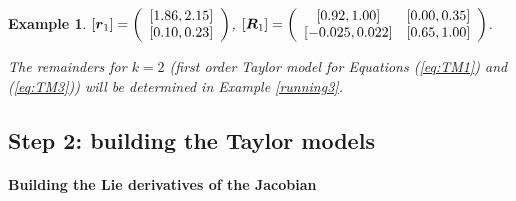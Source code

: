 \documentclass{sig-alternate-05-2015}
\newcommand\ForAuthors[1]%
 {\par\smallskip                     %
  \begin{center}%
   \fbox%
   {\parbox{0.9\linewidth}%
    {\raggedright\sc--- #1}%
   }%
  \end{center}%
  \par\smallskip                     %
 }
\newtheorem{example}{Example}
\def\intvl#1{\mbox{$[ #1 ]$}}
\begin{document}
\begin{example}
$\intvl{\r_1} = \left(\begin{array}{c}
\left[ 1.86,    2.15 \right]\\ 
\left[ 0.10,    0.23 \right] 
\end{array}\right)$, 
$\intvl{\bfm{R}_1} =\left(\begin{array}{cc} 
\left[    0.92,    1.00\right] & \left[    0.00,    0.35\right] \\
\left[   -0.025,    0.022\right] & \left[    0.65,    1.00\right] 
\end{array}\right)$. 

The remainders
for $k=2$ (first order Taylor model for Equations (\ref{eq:TM1}) and (\ref{eq:TM3}))
will be determined in Example \ref{running3}. 
\end{example}


\subsection{Step 2: building the Taylor models}

\paragraph{Building the Lie derivatives of the Jacobian}

\label{efficientLieJacobian}
\end{document}
